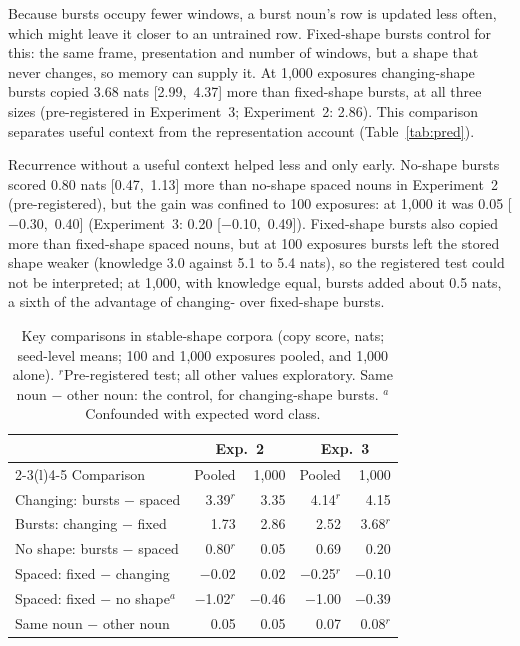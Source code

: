 \documentclass[11pt]{article}
\begin{document}
Because bursts occupy fewer windows, a burst noun's row is updated less often, which might leave it closer to an untrained row. Fixed-shape bursts control for this: the same frame, presentation and number of windows, but a shape that never changes, so memory can supply it. At 1,000 exposures changing-shape bursts copied 3.68 nats [2.99,~4.37] more than fixed-shape bursts, at all three sizes (pre-registered in Experiment~3; Experiment~2: 2.86). This comparison separates useful context from the representation account (Table~\ref{tab:pred}).

Recurrence without a useful context helped less and only early. No-shape bursts scored 0.80 nats [0.47,~1.13] more than no-shape spaced nouns in Experiment~2 (pre-registered), but the gain was confined to 100 exposures: at 1,000 it was 0.05 [$-$0.30,~0.40] (Experiment~3: 0.20 [$-$0.10,~0.49]). Fixed-shape bursts also copied more than fixed-shape spaced nouns, but at 100 exposures bursts left the stored shape weaker (knowledge 3.0 against 5.1 to 5.4 nats), so the registered test could not be interpreted; at 1,000, with knowledge equal, bursts added about 0.5 nats, a sixth of the advantage of changing- over fixed-shape bursts.

\begin{table}[t]
\centering
\small
\setlength{\tabcolsep}{2.6pt}
\begin{tabular}{@{}lrrrr@{}}
\toprule
& \multicolumn{2}{c}{Exp.~2} & \multicolumn{2}{c}{Exp.~3} \\
\cmidrule(lr){2-3}\cmidrule(l){4-5}
Comparison & Pooled & 1,000 & Pooled & 1,000 \\
\midrule
Changing: bursts $-$ spaced & 3.39$^r$ & 3.35 & 4.14$^r$ & 4.15 \\
Bursts: changing $-$ fixed & 1.73 & 2.86 & 2.52 & 3.68$^r$ \\
No shape: bursts $-$ spaced & 0.80$^r$ & 0.05 & 0.69 & 0.20 \\
Spaced: fixed $-$ changing & $-$0.02 & 0.02 & $-$0.25$^r$ & $-$0.10 \\
Spaced: fixed $-$ no shape$^a$\! & $-$1.02$^r$ & $-$0.46 & $-$1.00 & $-$0.39 \\
Same noun $-$ other noun & 0.05 & 0.05 & 0.07 & 0.08$^r$ \\
\bottomrule
\end{tabular}
\caption{Key comparisons in stable-shape corpora (copy score, nats; seed-level means; 100 and 1,000 exposures pooled, and 1,000 alone). $^r$Pre-registered test; all other values exploratory. Same noun $-$ other noun: the control, for changing-shape bursts. $^a$Confounded with expected word class.}
\label{tab:key}
\end{table}
\end{document}

